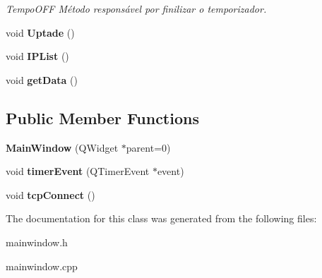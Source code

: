 \begin{DoxyCompactItemize}
\begin{DoxyCompactList}\small\item\em Tempo\+O\+FF Método responsável por finilizar o temporizador. \end{DoxyCompactList}\item 
\mbox{\label{class_main_window_ab2678a734a6631af8a5a1883dd163d02}} 
void {\bfseries Uptade} ()
\item 
\mbox{\label{class_main_window_a9078e29a3cfc4597f56ef449648c2f6b}} 
void {\bfseries I\+P\+List} ()
\item 
\mbox{\label{class_main_window_a4a2ddf4cf2ec8e240cc340416b1df792}} 
void {\bfseries get\+Data} ()
\end{DoxyCompactItemize}
\subsection*{Public Member Functions}
\begin{DoxyCompactItemize}
\item 
\mbox{\label{class_main_window_a8b244be8b7b7db1b08de2a2acb9409db}} 
{\bfseries Main\+Window} (Q\+Widget $\ast$parent=0)
\item 
\mbox{\label{class_main_window_aaa425b1554af3c1f58cc70b4815082ae}} 
void {\bfseries timer\+Event} (Q\+Timer\+Event $\ast$event)
\item 
\mbox{\label{class_main_window_ac5b669957c442b6eb68573dacfce33e1}} 
void {\bfseries tcp\+Connect} ()
\end{DoxyCompactItemize}


The documentation for this class was generated from the following files\+:\begin{DoxyCompactItemize}
\item 
mainwindow.\+h\item 
mainwindow.\+cpp\end{DoxyCompactItemize}
